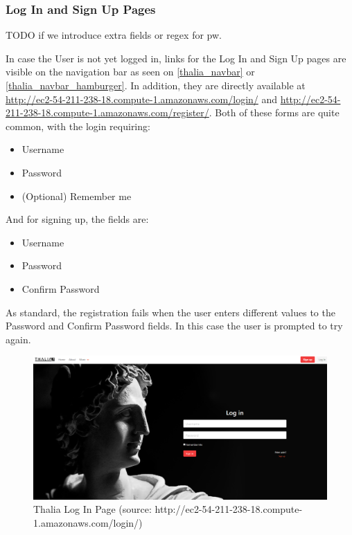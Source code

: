 \documentclass[main.tex]{subfiles}
\begin{document}
\subsubsection{Log In and Sign Up Pages}

TODO if we introduce extra  fields or regex for pw.

In case the User is not yet logged in, links for the Log In and Sign Up pages are visible on the navigation bar as seen on \figurename{\ref{thalia_navbar}} or \figurename{\ref{thalia_navbar_hamburger}}. In addition, they are directly available at \url{http://ec2-54-211-238-18.compute-1.amazonaws.com/login/} and \url{http://ec2-54-211-238-18.compute-1.amazonaws.com/register/}.
Both of these forms are quite common, with the login requiring:

\begin{itemize}
    \item Username
    \item Password
    \item (Optional) Remember me
\end{itemize}

And for signing up, the fields are:

\begin{itemize}
    \item Username
    \item Password
    \item Confirm Password
\end{itemize}

As standard, the registration fails when the user enters different values to the Password and Confirm Password fields. In this case the user is prompted to try again.

\begin{figure}[H]
   \centering
   \includegraphics[width=\textwidth]{08Appendices/081User/081Pictures/login.png}
   \caption{Thalia Log In Page (source: http://ec2-54-211-238-18.compute-1.amazonaws.com/login/)}
   \label{thalia_login}
\end{figure}
\end{document}

